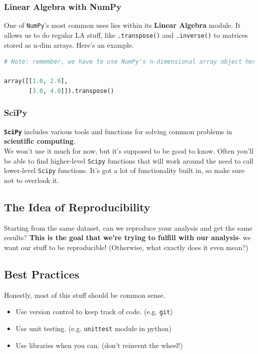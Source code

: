\documentclass[english, 10pt]{article}
\begin{document}
\subsubsection{Linear Algebra with NumPy}

One of \texttt{NumPy}'s most common uses lies within its \textbf{Linear Algebra} module. It allows us to do regular LA stuff, like \texttt{.transpose()} and \texttt{.inverse()} to matrices stored as n-dim arrays. Here's an example.

{\centering
\begin{lstlisting}[language=python]
# Note: remember, we have to use NumPy's n-dimensional array object here

array([[1.0, 2.0],
       [3.0, 4.0]]).transpose()
\end{lstlisting}
}

\subsubsection{SciPy}

\textbf{\texttt{SciPy}} includes various tools and functions for solving common problems in \textbf{scientific computing}.\\

We won't use it much for now, but it's supposed to be good to know. Often you'll be able to find higher-level \texttt{Scipy} functions that will work around the need to call lower-level \texttt{Scipy} functions. It's got a lot of functionality built in, so make sure not to overlook it.

\subsection{The Idea of Reproducibility}

Starting from the same dataset, can we reproduce your analysis and get the same results? \textbf{This is the goal that we're trying to fulfill with our analysis}- we want our stuff to be reproducible! (Otherwise, what exactly does it even mean?)

\subsection{Best Practices}

Honestly, most of this stuff should be common sense.

\begin{itemize}
	\item Use version control to keep track of code. (e.g. \texttt{git})
	\item Use unit testing. (e.g. \texttt{unittest} module in python)
	\item Use libraries when you can. (don't reinvent the wheel!)
\end{itemize}
\end{document}
